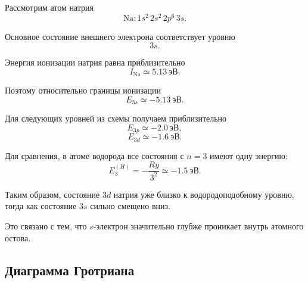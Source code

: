 \documentclass[../final.tex]{subfiles}
\begin{document}
Рассмотрим атом натрия
\begin{equation*}
    \mathrm{Na}:
    1s^2\,2s^2\,2p^6\,3s.
\end{equation*}

Основное состояние внешнего электрона соответствует уровню
\begin{equation*}
    3s.
\end{equation*}

Энергия ионизации натрия равна приблизительно
\begin{equation*}
    I_{\mathrm{Na}}
    \simeq
    5.13\ \text{эВ}.
\end{equation*}

Поэтому относительно границы ионизации
\begin{equation*}
    E_{3s}
    \simeq
    -5.13\ \text{эВ}.
\end{equation*}

Для следующих уровней из схемы получаем приблизительно
\begin{equation*}
    E_{3p}
    \simeq
    -2.0\ \text{эВ},
\end{equation*}
\begin{equation*}
    E_{3d}
    \simeq
    -1.6\ \text{эВ}.
\end{equation*}

Для сравнения, в атоме водорода все состояния с \(n=3\) имеют одну энергию:
\begin{equation*}
    E_3^{(H)}
    =
    -\frac{Ry}{3^2}
    \simeq
    -1.5\ \text{эВ}.
\end{equation*}

Таким образом, состояние \(3d\) натрия уже близко к водородоподобному
уровню, тогда как состояние \(3s\) сильно смещено вниз.

Это связано с тем, что \(s\)-электрон значительно глубже проникает
внутрь атомного остова.

%
%
%

\subsection{Диаграмма Гротриана}
\end{document}
